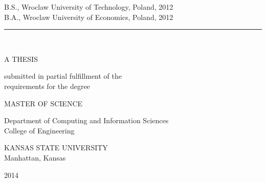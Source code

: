 \begin{center}
   B.S., Wroclaw University of Technology, Poland, 2012\\
   B.A., Wroclaw University of Economics, Poland, 2012\\

   \vspace{0.35cm}
   \rule{2in}{0.5pt}\\
   \vspace{0.65cm}

   {\large A THESIS}\\

   \vspace{0.3cm}
   \begin{singlespace}
   submitted in partial fulfillment of the\\
   requirements for the degree\\
   \end{singlespace}

   \vspace{0.3cm}


   {\large MASTER OF SCIENCE}\\
   \vspace{0.3cm}


   \begin{singlespace}
   Department of Computing and Information Sciences\\
   College of Engineering\\
   \end{singlespace}

   \vspace{0.3cm}

   \begin{singlespace}
   {\large KANSAS STATE UNIVERSITY}\\
   Manhattan, Kansas\\
   \end{singlespace}


   2014\\
   \vspace{0.3cm}

    \end{center}

